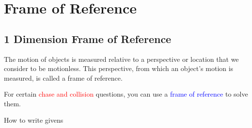 \section{Frame of Reference}
\subsection{1 Dimension Frame of Reference}

\begin{definition}
     The motion of objects is measured relative to a perspective or location that we consider to be motionless. 
    This perspective, from which an object's motion is measured, is called a frame of reference. 
\end{definition}

For certain \textcolor{red}{chase and collision} questions, you can use a \textcolor{blue}{frame of reference} 
to solve them.
\begin{example}
    How to write givens\\
\end{example}
